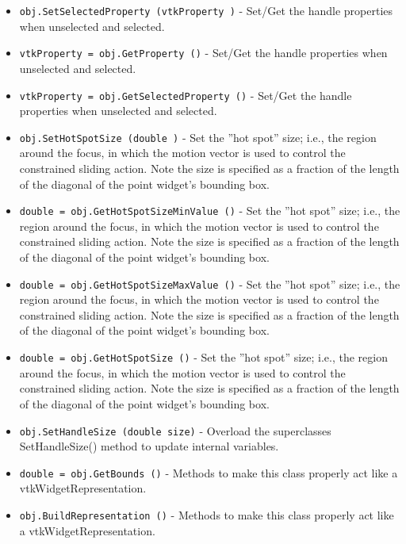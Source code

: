 \begin{itemize}
\item  \verb|obj.SetSelectedProperty (vtkProperty )| -  Set/Get the handle properties when unselected and selected.

\item  \verb|vtkProperty = obj.GetProperty ()| -  Set/Get the handle properties when unselected and selected.

\item  \verb|vtkProperty = obj.GetSelectedProperty ()| -  Set/Get the handle properties when unselected and selected.

\item  \verb|obj.SetHotSpotSize (double )| -  Set the ''hot spot'' size; i.e., the region around the focus, in which the
 motion vector is used to control the constrained sliding action. Note the
 size is specified as a fraction of the length of the diagonal of the 
 point widget's bounding box.

\item  \verb|double = obj.GetHotSpotSizeMinValue ()| -  Set the ''hot spot'' size; i.e., the region around the focus, in which the
 motion vector is used to control the constrained sliding action. Note the
 size is specified as a fraction of the length of the diagonal of the 
 point widget's bounding box.

\item  \verb|double = obj.GetHotSpotSizeMaxValue ()| -  Set the ''hot spot'' size; i.e., the region around the focus, in which the
 motion vector is used to control the constrained sliding action. Note the
 size is specified as a fraction of the length of the diagonal of the 
 point widget's bounding box.

\item  \verb|double = obj.GetHotSpotSize ()| -  Set the ''hot spot'' size; i.e., the region around the focus, in which the
 motion vector is used to control the constrained sliding action. Note the
 size is specified as a fraction of the length of the diagonal of the 
 point widget's bounding box.

\item  \verb|obj.SetHandleSize (double size)| -  Overload the superclasses SetHandleSize() method to update internal variables.

\item  \verb|double = obj.GetBounds ()| -  Methods to make this class properly act like a vtkWidgetRepresentation.

\item  \verb|obj.BuildRepresentation ()| -  Methods to make this class properly act like a vtkWidgetRepresentation.


\end{itemize}
